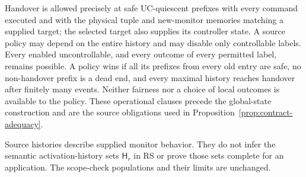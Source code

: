 Handover is allowed precisely at safe UC-quiescent prefixes with every command executed and with the physical tuple and new-monitor memories matching a supplied target; the selected target also supplies its controller state. A source policy may depend on the entire history and may disable only controllable labels. Every enabled uncontrollable, and every outcome of every permitted label, remains possible. A policy wins if all its prefixes from every old entry are safe, no non-handover prefix is a dead end, and every maximal history reaches handover after finitely many events. Neither fairness nor a choice of local outcomes is available to the policy. These operational clauses precede the global-state construction and are the source obligations used in Proposition~\ref{prop:contract-adequacy}.

Source histories describe supplied monitor behavior. They do not infer the semantic activation-history sets $\mathsf H_r$ in RS or prove those sets complete for an application. The scope-check populations and their limits are unchanged.
